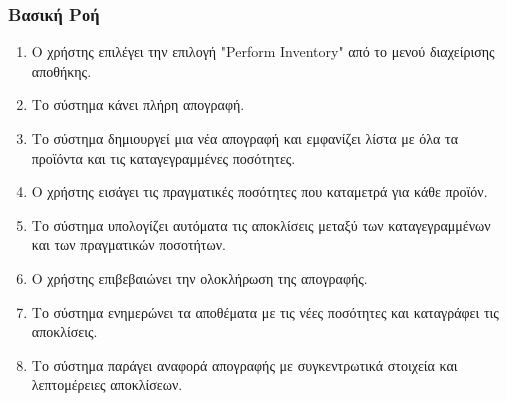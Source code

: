 \documentclass[12pt,a4paper,twoside]{book}
\begin{document}
\subsubsection{Βασική Ροή}
\begin{enumerate}
  \item Ο χρήστης επιλέγει την επιλογή "Perform Inventory" από το μενού διαχείρισης αποθήκης. %
  \item Το σύστημα κάνει πλήρη απογραφή.
  \item Το σύστημα δημιουργεί μια νέα απογραφή και εμφανίζει λίστα με όλα τα προϊόντα και τις καταγεγραμμένες ποσότητες. %
  \item Ο χρήστης εισάγει τις πραγματικές ποσότητες που καταμετρά για κάθε προϊόν.
  \item Το σύστημα υπολογίζει αυτόματα τις αποκλίσεις μεταξύ των καταγεγραμμένων και των πραγματικών ποσοτήτων.
  \item Ο χρήστης επιβεβαιώνει την ολοκλήρωση της απογραφής.
  \item Το σύστημα ενημερώνει τα αποθέματα με τις νέες ποσότητες και καταγράφει τις αποκλίσεις.
  \item Το σύστημα παράγει αναφορά απογραφής με συγκεντρωτικά στοιχεία και λεπτομέρειες αποκλίσεων.
\end{enumerate}
\end{document}
